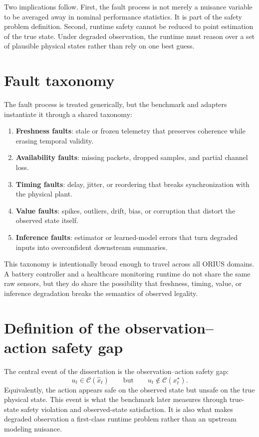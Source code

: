 Two implications follow. First, the fault process is not merely a nuisance variable to be
averaged away in nominal performance statistics. It is part of the safety problem definition.
Second, runtime safety cannot be reduced to point estimation of the true state. Under degraded
observation, the runtime must reason over a set of plausible physical states rather than rely on
one best guess.

\section{Fault taxonomy}
The fault process is treated generically, but the benchmark and adapters instantiate it through a
shared taxonomy:
\begin{enumerate}
  \item \textbf{Freshness faults}: stale or frozen telemetry that preserves coherence while
  erasing temporal validity.
  \item \textbf{Availability faults}: missing packets, dropped samples, and partial channel loss.
  \item \textbf{Timing faults}: delay, jitter, or reordering that breaks synchronization with the
  physical plant.
  \item \textbf{Value faults}: spikes, outliers, drift, bias, or corruption that distort the
  observed state itself.
  \item \textbf{Inference faults}: estimator or learned-model errors that turn degraded inputs
  into overconfident downstream summaries.
\end{enumerate}

This taxonomy is intentionally broad enough to travel across all ORIUS domains. A battery
controller and a healthcare monitoring runtime do not share the same raw sensors, but they do
share the possibility that freshness, timing, value, or inference degradation breaks the
semantics of observed legality.

\section{Definition of the observation--action safety gap}
The central event of the dissertation is the observation--action safety gap:
\[
u_t \in \mathcal{C}(\hat{x}_t)
\qquad \text{but} \qquad
u_t \notin \mathcal{C}(x_t^\star).
\]
Equivalently, the action appears safe on the observed state but unsafe on the true physical
state. This event is what the benchmark later measures through true-state safety violation and
observed-state satisfaction. It is also what makes degraded observation a first-class runtime
problem rather than an upstream modeling nuisance.

